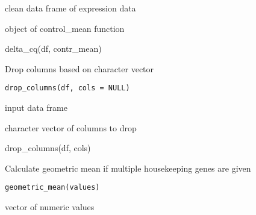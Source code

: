 \documentclass[letterpaper]{book}
\begin{document}
%
\begin{Arguments}
\begin{ldescription}
\item[\code{df}] clean data frame of expression data

\item[\code{contr\_mean}] object of control\_mean function
\end{ldescription}
\end{Arguments}
%
\begin{Examples}
\begin{ExampleCode}
delta_cq(df, contr_mean)
\end{ExampleCode}
\end{Examples}
%
\begin{Description}\relax
Drop columns based on character vector
\end{Description}
%
\begin{Usage}
\begin{verbatim}
drop_columns(df, cols = NULL)
\end{verbatim}
\end{Usage}
%
\begin{Arguments}
\begin{ldescription}
\item[\code{df}] input data frame

\item[\code{cols}] character vector of columns to drop
\end{ldescription}
\end{Arguments}
%
\begin{Examples}
\begin{ExampleCode}
drop_columns(df, cols)
\end{ExampleCode}
\end{Examples}
%
\begin{Description}\relax
Calculate geometric mean if multiple housekeeping genes are given
\end{Description}
%
\begin{Usage}
\begin{verbatim}
geometric_mean(values)
\end{verbatim}
\end{Usage}
%
\begin{Arguments}
\begin{ldescription}
\item[\code{values}] vector of numeric values
\end{ldescription}
\end{Arguments}
\end{document}
